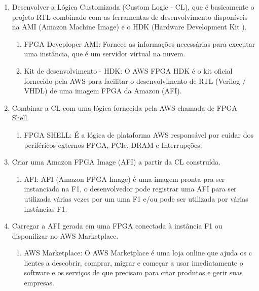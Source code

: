 \documentclass[conference]{IEEEtran}
\begin{document}
	\begin{enumerate}
		\item Desenvolver a Lógica Customizada (Custom Logic - CL), que é basicamente o projeto RTL combinado com as ferramentas de desenvolvimento disponíveis na AMI  (Amazon Machine Image) e o HDK (Hardware Development Kit ).
		\begin{enumerate}
			\item FPGA Deveploper
			AMI: Fornece as informações necessárias para executar uma instância, que é um servidor virtual na nuvem. 
			\item Kit de desenvolvimento - HDK: 
			O AWS FPGA HDK é o kit oficial fornecido pela AWS para facilitar o desenvolvimento de RTL (Verilog / VHDL) de uma imagem FPGA da Amazon (AFI).
		\end{enumerate}
		\item Combinar a CL com uma lógica fornecida
		pela AWS chamada de FPGA Shell.
		\begin{enumerate}
			\item FPGA SHELL: É a lógica de plataforma AWS responsável por cuidar dos periféricos externos FPGA, PCIe, DRAM e Interrupções.
		\end{enumerate}
		\item Criar uma Amazon FPGA Image (AFI) a partir da CL construída.
		\begin{enumerate}
			\item AFI: AFI (Amazon FPGA Image) é uma imagem pronta pra ser instanciada na F1, o desenvolvedor pode registrar uma AFI para ser utilizada várias vezes por um uma F1 e/ou pode ser utilizada por várias instâncias F1. 
		\end{enumerate}
		\item Carregar a AFI gerada em uma FPGA conectada à instância F1 ou disponilizar no AWS Marketplace.
		\begin{enumerate}
			\item AWS Marketplace: O AWS Marketplace é uma loja online que ajuda os c
			lientes a descobrir, comprar, migrar e começar a usar imediatamente o software e os serviços de que precisam para criar produtos e gerir suas empresas.  
		\end{enumerate}
	\end{enumerate}
\end{document}

